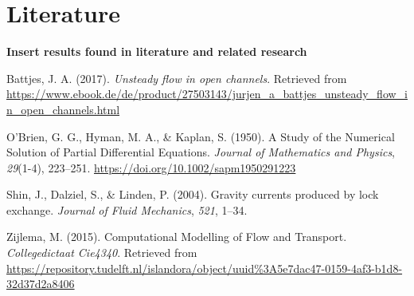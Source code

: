 \section{Literature}\label{literature}

\textbf{Insert results found in literature and related research}

\hypertarget{refs}{}
\hypertarget{ref-Battjes2017}{}
Battjes, J. A. (2017). \emph{Unsteady flow in open channels}. Retrieved
from
\url{https://www.ebook.de/de/product/27503143/jurjen_a_battjes_unsteady_flow_in_open_channels.html}

\hypertarget{ref-obrien_study_1950}{}
O'Brien, G. G., Hyman, M. A., \& Kaplan, S. (1950). A Study of the
Numerical Solution of Partial Differential Equations. \emph{Journal of
Mathematics and Physics}, \emph{29}(1-4), 223--251.
\url{https://doi.org/10.1002/sapm1950291223}

\hypertarget{ref-Shin2004}{}
Shin, J., Dalziel, S., \& Linden, P. (2004). Gravity currents produced
by lock exchange. \emph{Journal of Fluid Mechanics}, \emph{521}, 1--34.

\hypertarget{ref-zijlema_computational_2015}{}
Zijlema, M. (2015). Computational Modelling of Flow and Transport.
\emph{Collegedictaat Cie4340}. Retrieved from
\url{https://repository.tudelft.nl/islandora/object/uuid\%3A5e7dac47-0159-4af3-b1d8-32d37d2a8406}
